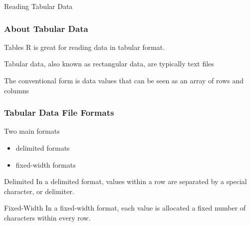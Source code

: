 \documentclass{beamer}\usepackage[]{graphicx}\usepackage[]{color}
\begin{document}
\begin{frame}
 \begin{center}
  \Huge{\textcolor{mandarina}{Reading Tabular Data}}
 \end{center}
\end{frame}


\begin{frame}[fragile]
\frametitle{About Tabular Data}

\begin{block}{Tables}
R is great for reading data in tabular  format.

\bigskip
Tabular data, also known as rectangular data, are typically text files 

\bigskip
The conventional form is data values that can be seen as an array of rows and columns
\end{block}

\end{frame}


\begin{frame}[fragile]
\frametitle{Tabular Data File Formats}

\begin{block}{Two main formats}
 \begin{itemize}
  \item delimited formats
  \item fixed-width formats
 \end{itemize}
\end{block}

\begin{block}{Delimited}
In a delimited format, values within a row are separated by a special character, or delimiter.
\end{block}

\begin{block}{Fixed-Width}
In a fixed-width format, each value is allocated a fixed number of characters within every row.
\end{block}

\end{frame}




\end{document}
